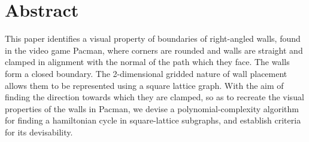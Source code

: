\section{Abstract}
This paper identifies a visual property of boundaries of right-angled walls, found in the video game Pacman, where corners are rounded and walls are straight and clamped in alignment with the normal of the path which they face. The walls form a closed boundary. The 2-dimensional gridded nature of wall placement allows them to be represented using a square lattice graph. With the aim of finding the direction towards which they are clamped, so as to recreate the visual properties of the walls in Pacman, we devise a polynomial-complexity algorithm for finding a hamiltonian cycle in square-lattice subgraphs, and establish criteria for its devisability.